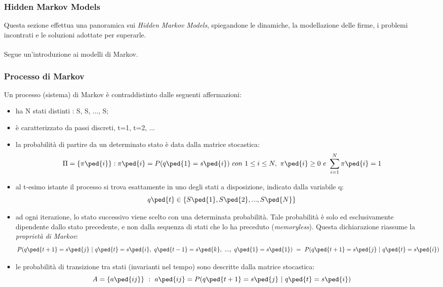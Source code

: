 \subsubsection{Hidden Markov Models}
\label{3.3.2}
Questa sezione effettua una panoramica sui \emph{Hidden Markov Models}, spiegandone le dinamiche, la modellazione delle firme, i problemi incontrati e le soluzioni adottate per superarle.\\\\
Segue un'introduzione ai modelli di Markov.
\subsubsection*{Processo di Markov}
\label{3.3.2.1}
Un processo (sistema) di Markov è contraddistinto dalle seguenti affermazioni:
\begin{itemize}
\item ha N stati distinti : S, S, ..., S;
\item è caratterizzato da passi discreti, t=1, t=2, ...
\item la probabilità di partire da un determinato stato è data dalla \gls{matrice stocastica}: 
\[ \Pi =\{\pi\ped{i}\}: \pi\ped{i}=P(q\ped{1} = s\ped{i})\ con\ 1\le i\le N,\  \pi\ped{i}\ge 0\  e\  \sum\limits_{i=1}^N \pi\ped{i} = 1 \]
\item al t-esimo istante il processo si trova esattamente in uno degli stati a disposizione, indicato dalla variabile q:
\[ q\ped{t} \in \{S\ped{1}, S\ped{2}, ..., S\ped{N}\}\]
\item ad ogni iterazione, lo stato successivo viene scelto con una determinata probabilità. Tale probabilità è solo ed esclusivamente dipendente dallo stato precedente, e non dalla sequenza di stati che lo ha preceduto (\emph{memoryless}). Questa dichiarazione riassume la \emph{proprietà di Markov}:
\[ P(q\ped{t+1}=s\ped{j}\ |\ q\ped{t}=s\ped{i},\ q\ped{t-1}=s\ped{k},\ ...,\ q\ped{1}=s\ped{1})\ =\ P(q\ped{t+1}=s\ped{j}\ |\ q\ped{t}=s\ped{i})\]
\item le probabilità di transizione tra stati (invarianti nel tempo) sono descritte dalla matrice stocastica:
\[ A=\{a\ped{ij}\}\ :\ a\ped{ij}=P(q\ped{t+1}=s\ped{j}\ |\ q\ped{t}=s\ped{i})\]
\end{itemize}
